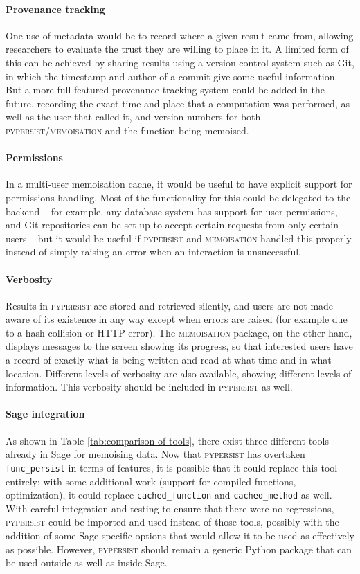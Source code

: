 \documentclass{deliverablereport}
\newcommand{\pypersist}{\textsc{pypersist}}
\newcommand{\Memoisation}{\textsc{memoisation}}
\begin{document}
\paragraph{Provenance tracking}
One use of metadata would be to record where a given result came from, allowing
researchers to evaluate the trust they are willing to place in it.  A limited
form of this can be achieved by sharing results using a version control system
such as Git, in which the timestamp and author of a commit give some useful
information.  But a more full-featured provenance-tracking system could be added
in the future, recording the exact time and place that a computation was
performed, as well as the user that called it, and version numbers for both
\pypersist{}/\Memoisation{} and the function being memoised.

\paragraph{Permissions}
In a multi-user memoisation cache, it would be useful to have explicit support
for permissions handling.  Most of the functionality for this could be delegated
to the backend -- for example, any database system has support for user
permissions, and Git repositories can be set up to accept certain requests from
only certain users -- but it would be useful if \pypersist{} and \Memoisation{} handled this
properly instead of simply raising an error when an interaction is unsuccessful.

\paragraph{Verbosity}
Results in \pypersist{} are stored and retrieved silently, and users are not
made aware of its existence in any way except when errors are raised (for
example due to a hash collision or HTTP error).  The \Memoisation{} package, on the other hand,
displays messages to the screen showing its progress, so that
interested users have a record of exactly what is being written and read at what
time and in what location.  Different levels of verbosity are also available, showing different
levels of information.  This verbosity should be included in \pypersist{} as well.

\paragraph{Sage integration}
As shown in Table \ref{tab:comparison-of-tools}, there exist three different
tools already in Sage for memoising data.  Now that \pypersist{} has overtaken
\texttt{func\_persist} in terms of features, it is possible that it could replace this tool
entirely; with some additional work (support for compiled functions,
optimization), it could replace \texttt{cached\_function} and
\texttt{cached\_method} as well.
With careful integration and testing to ensure that there were no
regressions, \pypersist{} could be imported and used instead of those tools,
possibly with the addition of some Sage-specific options that would allow it to
be used as effectively as possible.  However, \pypersist{} should remain a
generic Python package that can be used outside as well as inside Sage.
\end{document}
